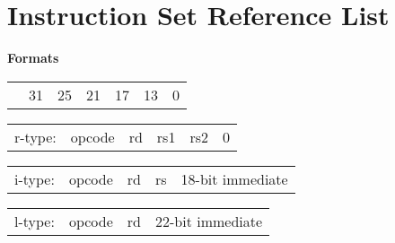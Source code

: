 \documentclass{article}
\begin{document}
\section{Instruction Set Reference List}
\bigskip

\begin{minipage}[t]{0.3\textwidth}
	\begin{center}
		\medskip
		\textbf{Formats}
	\end{center}
\end{minipage}
\begin{minipage}[t]{110mm}
	\begin{tabular}{p{12mm}p{15mm}p{10mm}p{10mm}p{10mm}p{22.5mm}R{22.5mm}}
		& 31 & 25 & 21 & 17 & 13 & 0 \\ 
	\end{tabular} 

	\begin{tabular}{p{12mm}|C{15mm}|C{10mm}|C{10mm}|C{10mm}|C{45mm}|}
		r-type: & opcode & rd & rs1 & rs2 & 0\\ 
	\end{tabular} 
	
	\medskip

	\begin{tabular}{p{12mm}|C{15mm}|C{10mm}|C{10mm}|C{55.15mm}|}
		i-type: & opcode & rd & rs & 18-bit immediate \\
	\end{tabular}

	\medskip
	
	\begin{tabular}{p{12mm}|C{15mm}|C{10mm}|C{65.3mm}|}
		l-type: & opcode & rd & 22-bit immediate \\
	\end{tabular}
	

\end{minipage}

\bigskip\bigskip\bigskip
\end{document}
